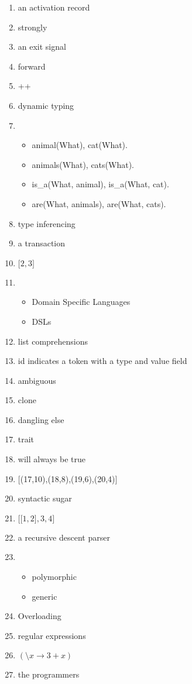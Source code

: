 \documentclass{exam}
\begin{document}
\begin{enumerate}
\begin{itemize}
\end{itemize}
\item an activation record
\item strongly
\item an exit signal
\item forward
\item ++
\item dynamic typing
\item \begin{itemize}
\item animal(What), cat(What).
\item animals(What), cats(What).
\item is\_a(What, animal), is\_a(What, cat).
\item are(What, animals), are(What, cats).
\end{itemize}
\item type inferencing
\item a transaction
\item $\lbrack 2, 3\rbrack$
\item \begin{itemize}
\item Domain Specific Languages
\item DSLs
\end{itemize}
\item list comprehensions
\item id indicates a token with a type and value field
\item ambiguous
\item clone
\item dangling else
\item trait
\item will always be true
\item $\lbrack$(17,10),(18,8),(19,6),(20,4)$\rbrack$
\item syntactic sugar
\item $\lbrack \lbrack 1, 2\rbrack, 3, 4\rbrack$
\item a recursive descent parser
\item \begin{itemize}
\item polymorphic
\item generic
\end{itemize}
\item Overloading
\item regular expressions
\item $(\setminus x \rightarrow 3 + x)$
\item the programmers

\end{enumerate}
\end{document}
